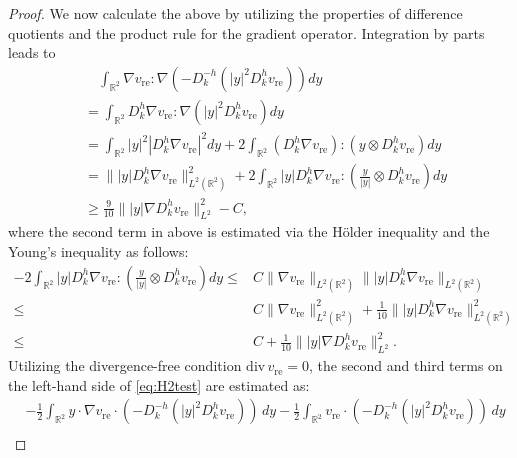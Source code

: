 \documentclass[12pt]{amsart}
\numberwithin{equation}{section}              %
\theoremstyle{remark}
\begin{document}
\begin{proof}
			We now calculate the above by utilizing the properties of difference quotients and the product rule for the gradient operator. 
			Integration by parts leads to
			\begin{equation}
				\begin{aligned}
					&\quad \int_{\mathbb{R}^2} \nabla v_{\text{re}} : \nabla (-D_k^{-h} (|y|^2 D_k^h v_{\text{re}}) ) dy \\
					&= \int_{\mathbb{R}^2} D_k^h \nabla v_{\text{re}} : \nabla (|y|^2 D_k^h v_{\text{re}}) dy \\
					&= \int_{\mathbb{R}^2} |y|^2 |D_k^h \nabla v_{\text{re}}|^2 dy + 2 \int_{\mathbb{R}^2} (D_k^h \nabla v_{\text{re}}) : (y \otimes D_k^h v_{\text{re}}) dy \\
					&= \||y| D_k^h \nabla v_{\text{re}}\|^2_{L^2(\mathbb{R}^2)} + 2 \int_{\mathbb{R}^2} |y| D_k^h \nabla v_{\text{re}} : \left( \frac{y}{|y|} \otimes D_k^h v_{\text{re}} \right) dy\\
					&	\geq  \frac{9}{10} \||y| \nabla D_k^h v_{\text{re}}\|_{L^2} ^2 - C,
				\end{aligned}
			\end{equation}
			where the second term in above is estimated via the H\"{o}lder inequality and the Young's inequality as follows:
			\begin{equation*}
				\begin{aligned}
					 - 2 \int_{\mathbb{R}^2} |y| D_k^h \nabla v_{\text{re}} : \left( \frac{y}{|y|} \otimes D_k^h v_{\text{re}} \right) dy 
					\leq & C \|\nabla v_{\text{re}}\|_{L^2(\mathbb{R}^2)} \||y| D_k^h \nabla v_{\text{re}}\|_{L^2(\mathbb{R}^2)} \\
					\leq&	 C \|\nabla v_{\text{re}}\|_{L^2(\mathbb{R}^2)}^2 + \frac{1}{10} \||y| D_k^h \nabla v_{\text{re}}\|_{L^2(\mathbb{R}^2)}^2\\
					\leq &C + \frac{1}{10} \||y| \nabla D_k^h v_{\text{re}}\|_{L^2} ^2.
				\end{aligned}
			\end{equation*}
			Utilizing the divergence-free condition $\mathrm{div} \, v_{\text{re}} = 0$, the second and third terms on the left-hand side of  \eqref{eq:H2test} are estimated as:
			\begin{equation*}
				\begin{aligned}
					& - \frac{1}{2} \int_{\mathbb{R}^2} y \cdot \nabla v_{\text{re}} \cdot (-D_k^{-h} (|y|^2 D_k^h v_{\text{re}})) \, dy - \frac{1}{2} \int_{\mathbb{R}^2} v_{\text{re}} \cdot (-D_k^{-h} (|y|^2 D_k^h v_{\text{re}})) \, dy \\

\end{aligned}
\end{equation*}
\end{proof}
\end{document}
